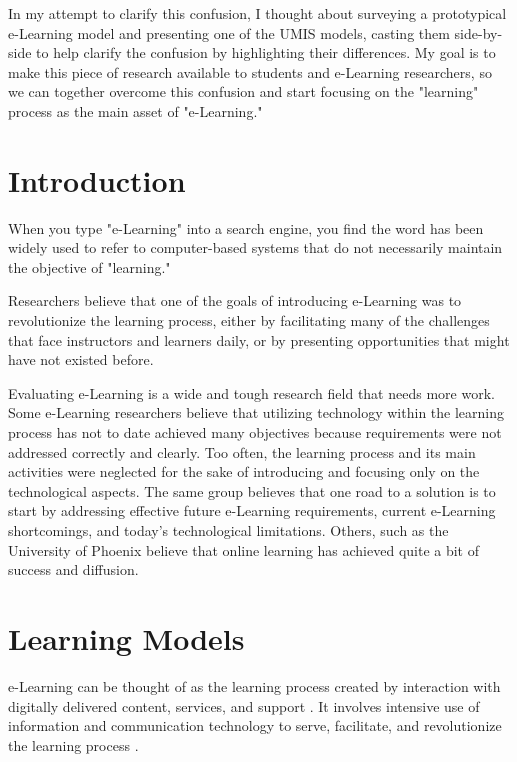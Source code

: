 \documentclass[12pt,a4paper,final,twoside,onecolumn,titlepage]{book}
\begin{document}
In my attempt to clarify this confusion, I thought about surveying a prototypical e-Learning model and presenting one of the \gls{UMIS} models, casting them side-by-side to help clarify the confusion by highlighting their differences. My goal is to make this piece of research available to students and e-Learning researchers, so we can together overcome this confusion and start focusing on the "learning" process as the main asset of "e-Learning."

\section{Introduction}
When you type "e-Learning" into a search engine, you find the word has been widely used to refer to computer-based systems that do not necessarily maintain the objective of "learning."

Researchers believe that one of the goals of introducing e-Learning was to revolutionize the learning process, either by facilitating many of the challenges that face instructors and learners daily, or by presenting opportunities that might have not existed before.

Evaluating e-Learning is a wide and tough research field that needs more work. Some e-Learning researchers believe that utilizing technology within the learning process has not to date achieved many objectives because requirements were not addressed correctly and clearly. Too often, the learning process and its main activities were neglected for the sake of introducing and focusing only on the technological aspects. The same group believes that one road to a solution is to start by addressing effective future e-Learning requirements, current e-Learning shortcomings, and today's technological limitations. Others, such as the University of Phoenix believe that online learning has achieved quite a bit of success and diffusion.

\section{Learning Models}
e-Learning can be thought of as the learning process created by interaction with digitally delivered content, services, and support \cite{UMIS10, UMIS14, MNAS05}. It involves intensive use of information and communication technology to serve, facilitate, and revolutionize the learning process \cite{EV02, R02, R01, R03, UMIS52}.
\end{document}
